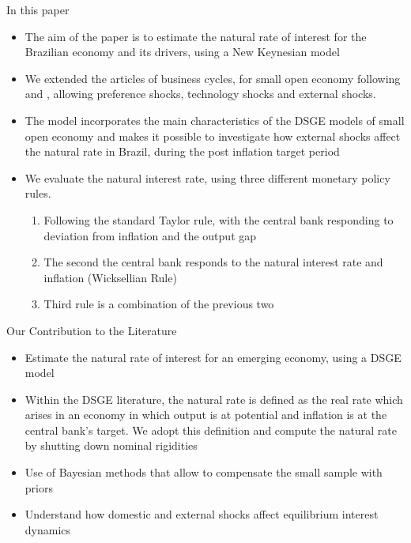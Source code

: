 \documentclass[9pt]{beamer}
\begin{document}
\begin{frame}{In this paper}
\begin{itemize}
\item The aim of the paper is to estimate the natural rate of interest for the Brazilian economy and its drivers, using a New Keynesian model

\item We extended the articles of business cycles, for small open economy following \textcolor{red}{\citet{Gali:2005}} and \textcolor{red}{\citet{Lubik:2007}}, allowing preference shocks, technology shocks and external shocks.

\item The model incorporates the main characteristics of the DSGE models of small open economy and makes it possible to investigate how external shocks affect the natural rate in Brazil, during the post inflation target period

\item We evaluate the natural interest rate, using three different monetary policy rules. 
\begin{enumerate}
    \item Following the standard Taylor rule, with the central bank responding to deviation from inflation and the output gap
    
    \item The second the central bank responds to the natural interest rate and inflation (Wicksellian Rule)
    
    \item Third rule is a combination of the previous two
\end{enumerate} 


\end{itemize}
\end{frame}
\begin{frame}{Our Contribution to the Literature}
\begin{itemize}
    \item Estimate the natural rate of interest for an emerging economy, using a DSGE model
    
    \item Within the DSGE literature, the natural rate is defined as the real rate which arises in an economy in which output is at potential and inflation is at the central bank's target. We adopt this definition and compute the natural rate by shutting down nominal rigidities
    
    
    \item Use of Bayesian methods that allow to compensate the small sample with priors
    
    \item Understand how domestic and external shocks affect equilibrium interest dynamics







\end{itemize}
\end{frame}
\end{document}
